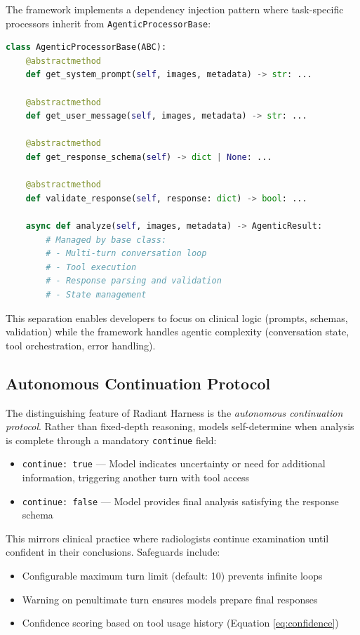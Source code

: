 \documentclass[11pt]{article}
\begin{document}
The framework implements a dependency injection pattern where task-specific processors inherit from \texttt{AgenticProcessorBase}:

\begin{lstlisting}[language=Python, caption=Abstract base class interface]
class AgenticProcessorBase(ABC):
    @abstractmethod
    def get_system_prompt(self, images, metadata) -> str: ...
    
    @abstractmethod  
    def get_user_message(self, images, metadata) -> str: ...
    
    @abstractmethod
    def get_response_schema(self) -> dict | None: ...
    
    @abstractmethod
    def validate_response(self, response: dict) -> bool: ...
    
    async def analyze(self, images, metadata) -> AgenticResult:
        # Managed by base class:
        # - Multi-turn conversation loop
        # - Tool execution
        # - Response parsing and validation
        # - State management
\end{lstlisting}

This separation enables developers to focus on clinical logic (prompts, schemas, validation) while the framework handles agentic complexity (conversation state, tool orchestration, error handling).

\subsection{Autonomous Continuation Protocol}

The distinguishing feature of Radiant Harness is the \textit{autonomous continuation protocol}. Rather than fixed-depth reasoning, models self-determine when analysis is complete through a mandatory \texttt{continue} field:

\begin{itemize}
    \item \texttt{continue: true} --- Model indicates uncertainty or need for additional information, triggering another turn with tool access
    \item \texttt{continue: false} --- Model provides final analysis satisfying the response schema
\end{itemize}

This mirrors clinical practice where radiologists continue examination until confident in their conclusions. Safeguards include:

\begin{itemize}
    \item Configurable maximum turn limit (default: 10) prevents infinite loops
    \item Warning on penultimate turn ensures models prepare final responses
    \item Confidence scoring based on tool usage history (Equation \ref{eq:confidence})
\end{itemize}
\end{document}
